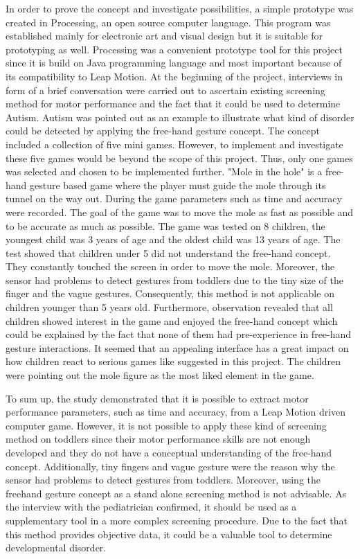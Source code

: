 In order to prove the concept and investigate possibilities, a simple prototype was created in Processing, an open source computer language. This program was established mainly for electronic art and visual design but it is suitable for prototyping as well. Processing was a convenient prototype tool for this project since it is build on Java programming language and most important because of its compatibility to Leap Motion.
At the beginning of the project, interviews in form of a brief conversation were carried out to ascertain existing screening method for motor performance and the fact that it could be used to determine Autism. Autism was pointed out as an example to illustrate what kind of disorder could be detected by applying the free-hand gesture concept. 
The concept included a collection of five mini games. However, to implement and investigate these five games would be beyond the scope of this project. Thus, only one games was selected and chosen to be implemented further. "Mole in the hole" is a free-hand gesture based game where the player must guide the mole through its tunnel on the way out. During the game parameters such as time and accuracy were recorded. The goal of the game was to move the mole as fast as possible and to be accurate as much as possible.
The game was tested on 8 children, the youngest child was 3 years of age and the oldest child was 13 years of age. The test showed that children under 5 did not understand the free-hand concept. They constantly touched the screen in order to move the mole. Moreover, the sensor had problems to detect gestures from toddlers due to the tiny size of the finger and the vague gestures. Consequently, this method is not applicable on children younger than 5 years old. 
Furthermore, observation revealed that all children showed interest in the game and enjoyed the free-hand concept which could be explained by the fact that none of them had pre-experience in free-hand gesture interactions. It seemed that an appealing interface has a great impact on how children react to serious games like suggested in this project. The children were pointing out the mole figure as the most liked element in the game. 

To sum up, the study demonstrated that it is possible to extract motor performance parameters, such as time and accuracy, from a Leap Motion driven computer game. However, it is not possible to apply these kind of screening method on toddlers since their motor performance skills are not enough developed and they do not have a conceptual understanding of the free-hand concept. Additionally, tiny fingers and vague gesture were the reason why the sensor had problems to detect gestures from toddlers.
Moreover, using the freehand gesture concept as a stand alone screening method is not advisable. As the interview with the pediatrician confirmed, it should be used as a supplementary tool in a more complex screening procedure. Due to the fact that this method provides objective data, it could be a valuable tool to determine developmental disorder.  



